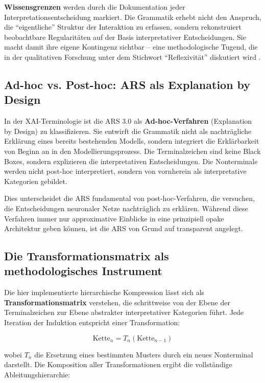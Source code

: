 \documentclass[
  12pt,
  a4paper,
  oneside,
  titlepage
]{article}
\begin{document}
\textbf{Wissensgrenzen} werden durch die Dokumentation jeder 
Interpretationsentscheidung markiert. Die Grammatik erhebt nicht den Anspruch, 
die \enquote{eigentliche} Struktur der Interaktion zu erfassen, sondern 
rekonstruiert beobachtbare Regularitäten auf der Basis interpretativer 
Entscheidungen. Sie macht damit ihre eigene Kontingenz sichtbar – eine 
methodologische Tugend, die in der qualitativen Forschung unter dem Stichwort 
\enquote{Reflexivität} diskutiert wird \citep[ S.~129]{Flick2019}.

\subsection{Ad-hoc vs. Post-hoc: ARS als Explanation by Design}

In der XAI-Terminologie ist die ARS 3.0 als \textbf{Ad-hoc-Verfahren} (Explanation 
by Design) zu klassifizieren. Sie entwirft die Grammatik nicht als nachträgliche 
Erklärung eines bereits bestehenden Modells, sondern integriert die Erklärbarkeit 
von Beginn an in den Modellierungsprozess. Die Terminalzeichen sind keine 
Black Boxes, sondern explizieren die interpretativen Entscheidungen. Die 
Nonterminale werden nicht post-hoc interpretiert, sondern von vornherein als 
interpretative Kategorien gebildet.

Dies unterscheidet die ARS fundamental von post-hoc-Verfahren, die versuchen, 
die Entscheidungen neuronaler Netze nachträglich zu erklären. Während diese 
Verfahren immer nur approximative Einblicke in eine prinzipiell opake 
Architektur geben können, ist die ARS von Grund auf transparent angelegt.

\subsection{Die Transformationsmatrix als methodologisches Instrument}

Die hier implementierte hierarchische Kompression lässt sich als 
\textbf{Transformationsmatrix} verstehen, die schrittweise von der Ebene der 
Terminalzeichen zur Ebene abstrakter interpretativer Kategorien führt. Jede 
Iteration der Induktion entspricht einer Transformation:

\[
\text{Kette}_n = T_n(\text{Kette}_{n-1})
\]

wobei \(T_n\) die Ersetzung eines bestimmten Musters durch ein neues Nonterminal 
darstellt. Die Komposition aller Transformationen ergibt die vollständige 
Ableitungshierarchie:
\end{document}

